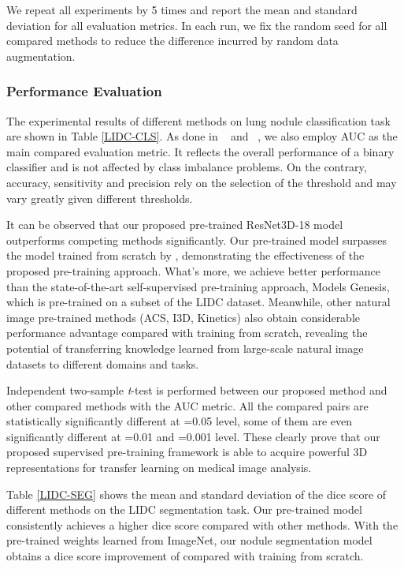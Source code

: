 \documentclass[journal,twoside,web]{ieeecolor}
\begin{document}
We repeat all experiments by 5 times and report the mean and standard deviation for all evaluation metrics. In each run, we fix the random seed for all compared methods to reduce the difference incurred by random data augmentation.  




\subsubsection{Performance Evaluation}



The experimental results of different methods on lung nodule classification task are shown in Table \ref{LIDC-CLS}. 
As done in ~\cite{zhou2020models} and ~\cite{yang2019reinventing}, we also employ AUC as the main compared evaluation metric. It reflects the overall performance of a binary classifier and is not affected by class imbalance problems. On the contrary, accuracy, sensitivity and precision rely on the selection of the threshold and may vary greatly given different thresholds. 


It can be observed that our proposed pre-trained ResNet3D-18 model outperforms competing methods significantly.
Our pre-trained model surpasses the model trained from scratch by , demonstrating the effectiveness of the proposed pre-training approach. What's more, we achieve better performance than the state-of-the-art self-supervised pre-training approach, Models Genesis, which is pre-trained on a subset of the LIDC dataset. Meanwhile, other natural image pre-trained methods (ACS, I3D, Kinetics) also obtain considerable performance advantage compared with training from scratch, revealing the potential of transferring knowledge learned from large-scale natural image datasets to different domains and tasks. 

Independent two-sample \textit{t}-test is performed between our proposed method and other compared methods with the AUC metric. All the compared pairs are statistically significantly different at =0.05 level, some of them are even significantly different at =0.01 and =0.001 level. These clearly prove that our proposed supervised pre-training framework is able to acquire powerful 3D representations for transfer learning on medical image analysis. 

Table \ref{LIDC-SEG} shows the mean and standard deviation of the dice score of different methods on the LIDC segmentation task.
Our pre-trained model consistently achieves a higher dice score compared with other methods. With the pre-trained weights learned from ImageNet, our nodule segmentation model obtains a dice score improvement of  compared with training from scratch.
\end{document}
